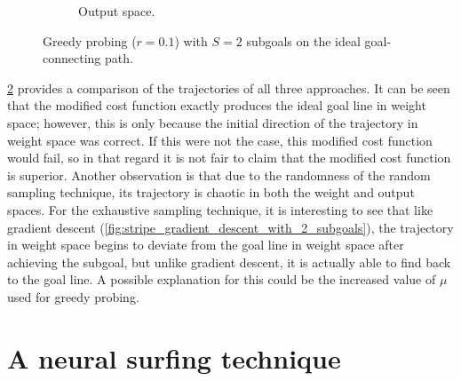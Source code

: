 \begin{figure}
\begin{subfigure}{.45\textwidth}
        \caption{Output space.}
        \label{fig:stripe_greedy_probing_with_2_subgoals_output_space}
    \end{subfigure}
    \caption{Greedy probing ($r=0.1$) with $S=2$ subgoals on the ideal goal-connecting path.}
    \label{fig:stripe_greedy_probing_with_2_subgoals}
\end{figure}
\ref{fig:stripe_greedy_probing_with_2_subgoals} provides a comparison of the trajectories of all three approaches.
It can be seen that the modified cost function exactly produces the ideal goal line in weight space; however, this is only because the initial direction of the trajectory in weight space was correct.
If this were not the case, this modified cost function would fail, so in that regard it is not fair to claim that the modified cost function is superior.
Another observation is that due to the randomness of the random sampling technique, its trajectory is chaotic in both the weight and output spaces.
For the exhaustive sampling technique, it is interesting to see that like gradient descent (\ref{fig:stripe_gradient_descent_with_2_subgoals}), the trajectory in weight space begins to deviate from the goal line in weight space after achieving the subgoal, but unlike gradient descent, it is actually able to find back to the goal line. 
A possible explanation for this could be the increased value of $\mu$ used for greedy probing.

\chapter{A neural surfing technique}

